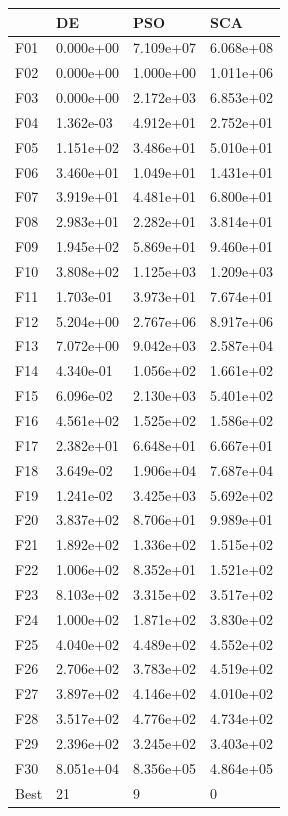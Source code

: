 \begin{tabular}{llll}
\toprule
{} &         DE &        PSO &        SCA \\
\midrule
F01  &  0.000e+00 &  7.109e+07 &  6.068e+08 \\
F02  &  0.000e+00 &  1.000e+00 &  1.011e+06 \\
F03  &  0.000e+00 &  2.172e+03 &  6.853e+02 \\
F04  &  1.362e-03 &  4.912e+01 &  2.752e+01 \\
F05  &  1.151e+02 &  3.486e+01 &  5.010e+01 \\
F06  &  3.460e+01 &  1.049e+01 &  1.431e+01 \\
F07  &  3.919e+01 &  4.481e+01 &  6.800e+01 \\
F08  &  2.983e+01 &  2.282e+01 &  3.814e+01 \\
F09  &  1.945e+02 &  5.869e+01 &  9.460e+01 \\
F10  &  3.808e+02 &  1.125e+03 &  1.209e+03 \\
F11  &  1.703e-01 &  3.973e+01 &  7.674e+01 \\
F12  &  5.204e+00 &  2.767e+06 &  8.917e+06 \\
F13  &  7.072e+00 &  9.042e+03 &  2.587e+04 \\
F14  &  4.340e-01 &  1.056e+02 &  1.661e+02 \\
F15  &  6.096e-02 &  2.130e+03 &  5.401e+02 \\
F16  &  4.561e+02 &  1.525e+02 &  1.586e+02 \\
F17  &  2.382e+01 &  6.648e+01 &  6.667e+01 \\
F18  &  3.649e-02 &  1.906e+04 &  7.687e+04 \\
F19  &  1.241e-02 &  3.425e+03 &  5.692e+02 \\
F20  &  3.837e+02 &  8.706e+01 &  9.989e+01 \\
F21  &  1.892e+02 &  1.336e+02 &  1.515e+02 \\
F22  &  1.006e+02 &  8.352e+01 &  1.521e+02 \\
F23  &  8.103e+02 &  3.315e+02 &  3.517e+02 \\
F24  &  1.000e+02 &  1.871e+02 &  3.830e+02 \\
F25  &  4.040e+02 &  4.489e+02 &  4.552e+02 \\
F26  &  2.706e+02 &  3.783e+02 &  4.519e+02 \\
F27  &  3.897e+02 &  4.146e+02 &  4.010e+02 \\
F28  &  3.517e+02 &  4.776e+02 &  4.734e+02 \\
F29  &  2.396e+02 &  3.245e+02 &  3.403e+02 \\
F30  &  8.051e+04 &  8.356e+05 &  4.864e+05 \\
Best &         21 &          9 &          0 \\
\bottomrule
\end{tabular}
